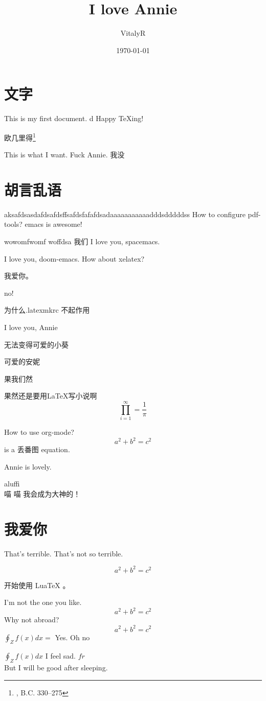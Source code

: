 \documentclass[UTF8]{ctexart}
\title{I love Annie}
\author{VitalyR}
\date{\today}
\begin{document}

\maketitle
\tableofcontents

\section{文字}
This is my first document.
d
Happy \TeX ing!

欧几里得\footnote{, B.C. 330--275}

This is what I want.
Fuck Annie.
我没

\section{胡言乱语}

aksafdsasdafdsafdsffsafdsfafafdsadaaaaaaaaaaadddsdddddss
How to configure pdf-tools?
emacs is awesome!

wowomfwomf woffdsa
我们
I love you, spacemacs.

I love you, doom-emacs.
How about xelatex?

我爱你。

no!

为什么.latexmkrc 不起作用

I love you, Annie

无法变得可爱的小葵

可爱的安妮

果我们然

果然还是要用\LaTeX 写小说啊
\begin{equation}
	\prod_{i=1}^{\infty}=\frac{1}{\pi}
\end{equation}

How to use org-mode?
\[a^{2}+b^{2}=c^{2}\] is a 丢番图 equation.

Annie is lovely.

aluffi \\
喵
喵
我会成为大神的！

\section{我爱你}

That's terrible.
That's not so terrible.



\begin{equation}
	\label{eq:2}
	a^{2}+b^{2}=c^{2}
\end{equation}

开始使用 LuaTeX 。

I'm not the one you like.
\[a^{2}+b^{2}=c^{2}\]
Why not abroad?
\[a^{2}+b^{2}=c^{2}\] \(\oint_{Z}f(x)dx = \) Yes.
Oh
no

\(\oint_{Z}f(x)dx\)
I feel sad.
\(fr\)
\[\]
But I will be good after sleeping.
\end{document}
